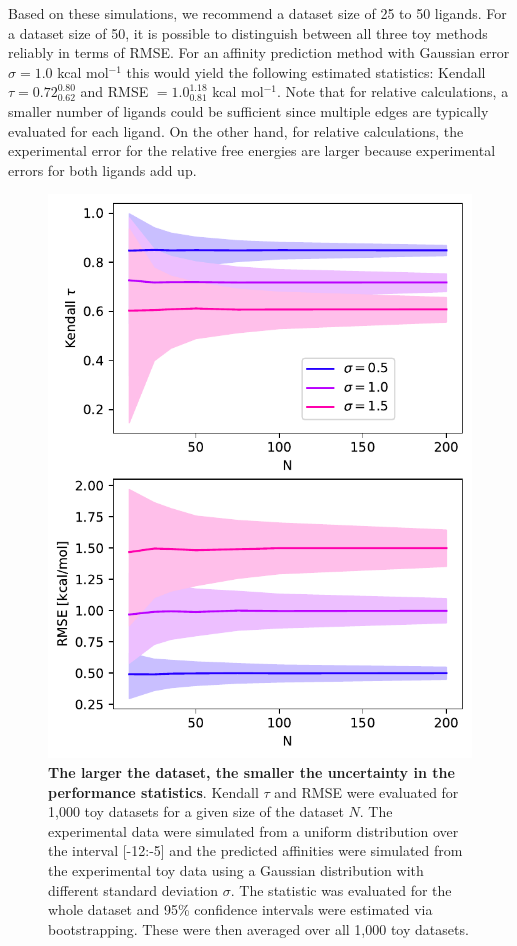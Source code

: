 \documentclass[9pt,bestpractices]{livecoms}
\begin{document}
Based on these simulations, we recommend a dataset size of 25 to 50 ligands. For a dataset size of 50, it is possible to distinguish between all three toy methods reliably in terms of RMSE. For an affinity prediction method with Gaussian error $\sigma = 1.0$ kcal mol$^{-1}$ this would yield the following estimated statistics: Kendall $\tau = 0.72_{0.62}^{0.80}$ and RMSE $= 1.0_{0.81}^{1.18}$ kcal mol$^{-1}$. Note that for relative calculations, a smaller number of ligands could be sufficient since multiple edges are typically evaluated for each ligand. On the other hand, for relative calculations, the experimental error for the relative free energies are larger because experimental errors for both ligands add up. 

\begin{figure}
    \centering
    \includegraphics[width=0.95\linewidth]{figures/N-CI.pdf}
    \caption{\textbf{The larger the dataset, the smaller the uncertainty in the performance statistics}. Kendall $\tau$ and RMSE were evaluated for 1,000 toy datasets for a given size of the dataset $N$. The experimental data were simulated from a uniform distribution over the interval [-12:-5] and the predicted affinities were simulated from the experimental toy data using a Gaussian distribution with different standard deviation $\sigma$. The statistic was evaluated for the whole dataset and 95\% confidence intervals were estimated via bootstrapping. These were then averaged over all 1,000 toy datasets.}
    \label{fig:N_CI}
\end{figure}
\end{document}
